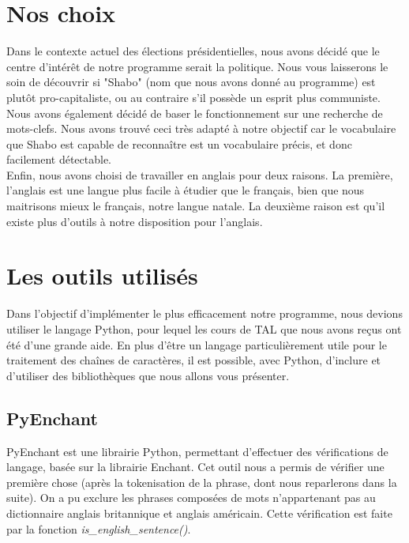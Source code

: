 \documentclass[paper=a4]{article}
\begin{document}

\section{Nos choix}

Dans le contexte actuel des élections présidentielles, nous avons décidé
que le centre d'intérêt de notre programme serait la politique.
Nous vous laisserons le soin de découvrir si "Shabo" (nom que nous avons
donné au programme) est plutôt pro-capitaliste, ou au contraire s'il
possède un esprit plus communiste. \\

Nous avons également décidé de baser le fonctionnement sur une recherche
de mots-clefs. Nous avons trouvé ceci très adapté à notre objectif car le
vocabulaire que Shabo est capable de reconnaître est un vocabulaire
précis, et donc facilement détectable. \\

Enfin, nous avons choisi de travailler en anglais pour deux raisons. La
première, l'anglais est une langue plus facile à étudier que le
français, bien que nous maitrisons mieux le français, notre langue
natale. La deuxième raison est qu'il existe plus d'outils à notre
disposition pour l'anglais. \\



\section{Les outils utilisés}

Dans l'objectif d'implémenter le plus efficacement notre programme, nous
devions utiliser le langage Python, pour lequel les cours de TAL que
nous avons reçus ont été d'une grande aide. En plus d'être un langage
particulièrement utile pour le traitement des chaînes de caractères, il
est possible, avec Python, d'inclure et d'utiliser des bibliothèques que
nous allons vous présenter.

\subsection{PyEnchant}

PyEnchant est une librairie Python, permettant d'effectuer des
vérifications de langage, basée sur la librairie Enchant. Cet outil
nous a permis de vérifier une première chose (après la tokenisation de
la phrase, dont nous reparlerons dans la suite). On a pu exclure les
phrases composées de mots n'appartenant pas au dictionnaire anglais
britannique et anglais américain. Cette vérification est faite par la
fonction \textit{is\_english\_sentence()}. \\
\end{document}
